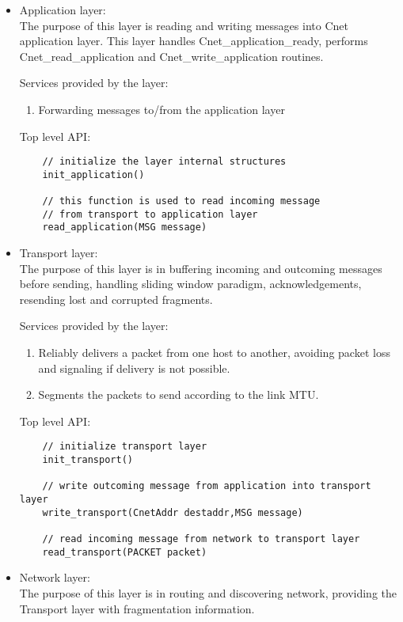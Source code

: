 \documentclass{article}
\begin{document}
\begin{itemize}
  \item Application layer: \\
		The purpose of this layer is reading and writing messages into Cnet
		application layer. This layer handles Cnet\_application\_ready, performs
		Cnet\_read\_application and Cnet\_write\_application routines.
		
		Services provided by the layer:
		\begin{enumerate}
		  \item Forwarding messages to/from the application layer 
		\end{enumerate}
	
	Top level API:
	\begin{verbatim}
    // initialize the layer internal structures
    init_application()
		
    // this function is used to read incoming message 
    // from transport to application layer
    read_application(MSG message) 
	\end{verbatim}
		
\item	Transport layer: \\
		The purpose of this layer is in buffering incoming and outcoming messages
		before sending, handling sliding window paradigm, acknowledgements, resending
		lost and corrupted fragments.
		
		Services provided by the layer:
    \begin{enumerate}
      \item Reliably delivers a packet from one host to another, avoiding packet
      loss and signaling if delivery is not possible.
      \item Segments the packets to send according to the link MTU.
    \end{enumerate}
		
		Top level API:
  \begin{verbatim}
    // initialize transport layer
    init_transport()
	
    // write outcoming message from application into transport layer
    write_transport(CnetAddr destaddr,MSG message) 
		
    // read incoming message from network to transport layer
    read_transport(PACKET packet)
  \end{verbatim}
		
		
\item Network layer: \\
		The purpose of this layer is in routing and discovering network, providing the
		Transport layer with fragmentation information.
		

\end{itemize}
\end{document}
